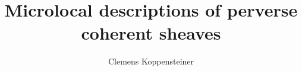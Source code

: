 \documentclass[english]{thesis}
\title{Microlocal descriptions of perverse coherent sheaves}
\author{Clemens Koppensteiner}
\begin{document}
\frontmatter

\maketitlepage

\tableofcontents

\mainmatter










\backmatter

\printbibliography
\end{document}
